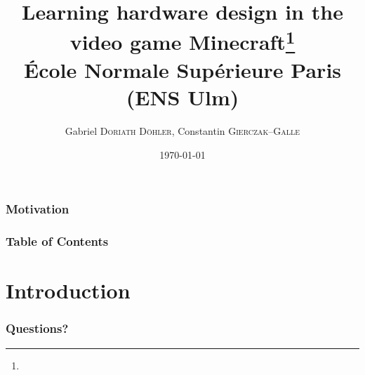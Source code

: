 \documentclass{beamer}
\title{Learning hardware design in the video game Minecraft\footnote{\tiny{}\reproduce}\\\small{} École Normale Supérieure Paris (ENS Ulm)}
\author{Gabriel \textsc{Doriath Döhler}, Constantin \textsc{Gierczak--Galle}}
\date{\paramDate\ifx\paramDate\empty\today\fi}
\begin{document}
\beamertemplatenavigationsymbolsempty
{}

\maketitle

\begin{frame}[fragile]
\frametitle{Motivation}

\end{frame}

\begin{frame}[fragile]
\frametitle{Table of Contents}
\tableofcontents
\end{frame}

\section{Introduction}

\begin{frame}[fragile]
\frametitle{Questions?}
\end{frame}

\newpage


\end{document}

